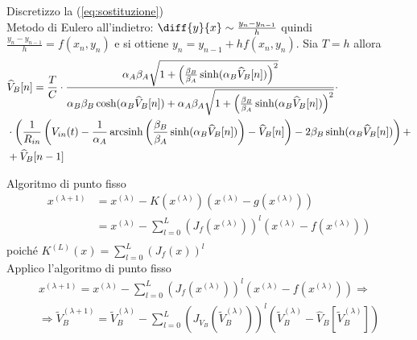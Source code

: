 		Discretizzo la (\ref{eq:sostituzione})\\
		Metodo di Eulero all'indietro: $\diff{y}{x} \sim \frac{y_{n}-y_{n-1}}{h}$ quindi $\frac{y_{n}-y_{n-1}}{h} = f(x_{n},y_{n})$ e si ottiene $y_{n} = y_{n-1}+hf(x_{n},y_{n})$. Sia $T = h$ allora
		\begin{equation}
			\label{eq:discretizzazione}
			\begin{split}
				&\widehat V_{B}[n] = \frac{T}{C}\cdot\frac{\alpha_{A}\beta_{A}\sqrt{1+\left(\frac{\beta_{B}}{\beta_{A}}\sinh(\alpha_{B}\widehat V_{B}[n])\right)^{2}}}{\alpha_{B}\beta_{B}\cosh(\alpha_{B}\widehat V_{B}[n])+\alpha_{A}\beta_{A}\sqrt{1+\left(\frac{\beta_{B}}{\beta_{A}}\sinh(\alpha_{B}\widehat V_{B}[n])\right)^{2}}}\cdot\\&\cdot\left(\frac{1}{R_{in}}\left(V_{in}(t)-\frac{1}{\alpha_{A}} \operatorname{arcsinh} \left(\frac{\beta_{B}}{\beta_{A}} \sinh(\alpha_{B}\widehat V_{B}[n])\right)-\widehat V_{B}[n]\right)-2\beta_{B}\sinh(\alpha_{B}\widehat V_{B}[n])\right)+\\&+\widehat V_{B}[n-1]\\
			\end{split}
		\end{equation}
		
		Algoritmo di punto fisso
		\begin{equation}
			\label{eq:punto_fisso1}
			\begin{split}
				x^{(\lambda+1)} &= x^{(\lambda)}-K(x^{(\lambda)})(x^{(\lambda)}-g(x^{(\lambda)}))\\
				&= x^{(\lambda)}-\sum_{l=0}^{L} \left(J_{f}(x^{(\lambda)})\right)^{l}(x^{(\lambda)}-f(x^{(\lambda)}))\\
			\end{split}
		\end{equation}
		poiché $K^{(L)}(x) = \sum_{l=0}^{L} \left(J_{f}(x)\right)^{l}$\\
		
		Applico l'algoritmo di punto fisso
		\begin{equation}
			\label{eq:punto_fisso2}
			\begin{split}
				x^{(\lambda+1)} = x^{(\lambda)}-\sum_{l=0}^{L} \left(J_{f}(x^{(\lambda)})\right)^{l}(x^{(\lambda)}-f(x^{(\lambda)}))\Rightarrow\\
				\Rightarrow \widetilde V_{B}^{(\lambda+1)} = \widetilde V_{B}^{(\lambda)}-\sum_{l=0}^{L} \left(J_{V_{B}}(\widetilde V_{B}^{(\lambda)})\right)^{l}(\widetilde V_{B}^{(\lambda)}-\widehat V_{B}[\widetilde V_{B}^{(\lambda)}])
			\end{split}
		\end{equation}
		
